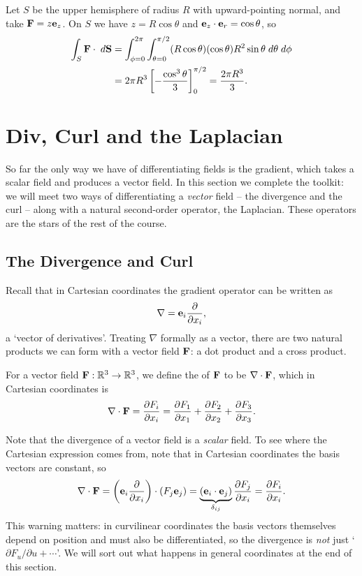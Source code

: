 \documentclass[a4paper]{scrartcl}
\begin{document}
\begin{example}
	Let $S$ be the upper hemisphere of radius $R$ with upward-pointing normal, and take $\mathbf{F} = z \mathbf{e}_z$. On $S$ we have $z = R\cos \theta$ and $\mathbf{e}_z \cdot \mathbf{e}_r = \cos \theta$, so
	\begin{align*}
		\int_S \mathbf{F} \cdot \; d \mathbf{S} &= \int_{\phi = 0}^{2 \pi} \int_{\theta = 0}^{\pi/2} (R \cos \theta)( \cos \theta) R^2 \sin \theta \; d \theta \; d \phi \\
		&= 2 \pi R^3 \left[-\frac{\cos^3 \theta}{3}\right]_0^{\pi/2} = \frac{2 \pi R^3}{3}.
	\end{align*}
\end{example}
\section{Div, Curl and the Laplacian}

So far the only way we have of differentiating fields is the gradient, which takes a scalar field and produces a vector field. In this section we complete the toolkit: we will meet two ways of differentiating a \emph{vector} field -- the divergence and the curl -- along with a natural second-order operator, the Laplacian. These operators are the stars of the rest of the course.

\subsection{The Divergence and Curl}

Recall that in Cartesian coordinates the gradient operator can be written as
$$
\nabla = \mathbf{e}_i \frac{\partial}{\partial x_i},
$$
a `vector of derivatives'. Treating $\nabla$ formally as a vector, there are two natural products we can form with a vector field $\mathbf{F}$: a dot product and a cross product.

\begin{definition}[Divergence]
	For a vector field $\mathbf{F}: \mathbb{R}^3 \rightarrow \mathbb{R}^3$, we define the  of $\mathbf{F}$ to be $\nabla \cdot \mathbf{F}$, which in Cartesian coordinates is
	$$
	\nabla \cdot \mathbf{F} = \frac{\partial F_i}{\partial x_i} = \frac{\partial F_1}{\partial x_1} + \frac{\partial F_2}{\partial x_2} + \frac{\partial F_3}{\partial x_3}.
	$$
\end{definition}

Note that the divergence of a vector field is a \emph{scalar} field. To see where the Cartesian expression comes from, note that in Cartesian coordinates the basis vectors are constant, so
$$
\nabla \cdot \mathbf{F} = \left(\mathbf{e}_i \frac{\partial}{\partial x_i}\right) \cdot (F_j \mathbf{e}_j) = \underbrace{(\mathbf{e}_i \cdot \mathbf{e}_j)}_{\delta_{ij}} \frac{\partial F_j}{\partial x_i} = \frac{\partial F_i}{\partial x_i}.
$$
This warning matters: in curvilinear coordinates the basis vectors themselves depend on position and must also be differentiated, so the divergence is \emph{not} just `$\partial F_u / \partial u + \cdots$'. We will sort out what happens in general coordinates at the end of this section.
\end{document}
